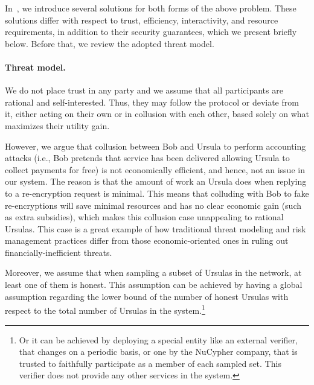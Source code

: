 \documentclass{llncs}
\begin{document}
 In~\cite{confirm-activity-draft}, we introduce several solutions for both forms of the above problem. These solutions differ with respect to trust, efficiency, interactivity, and resource requirements, in addition to their security guarantees, which we present briefly below. Before that, we review the adopted threat model.


\paragraph{Threat model.} We do not place trust in any party and we assume that all participants are rational and self-interested. Thus, they may follow the protocol or deviate from it, either acting on their own or in collusion with each other, based solely on what maximizes their utility gain. 


However, we argue that collusion between Bob and Ursula to perform accounting attacks (i.e., Bob pretends that service has been delivered allowing Ursula to collect payments for free) is not economically efficient, and hence, not an issue in our system. The reason is that the amount of work an Ursula does when replying to a re-encryption request is minimal. This means that colluding with Bob to fake re-encryptions will save minimal resources and has no clear economic gain (such as extra subsidies), which makes this collusion case unappealing to rational Ursulas. This case is a great example of how traditional threat modeling and risk management practices differ from those economic-oriented ones in ruling out financially-inefficient threats.


Moreover, we assume that when sampling a subset of Ursulas in the network, at least one of them is honest. This assumption can be achieved by having a global assumption regarding the lower bound of the number of 
honest Ursulas with respect to the total number of Ursulas in the system.\footnote{Or it can be achieved by deploying a special entity like an external verifier, that changes on a periodic basis, or one by the NuCypher company, that is trusted to faithfully participate as a member of each sampled set. This verifier does not provide any other services in the system.}
\end{document}
